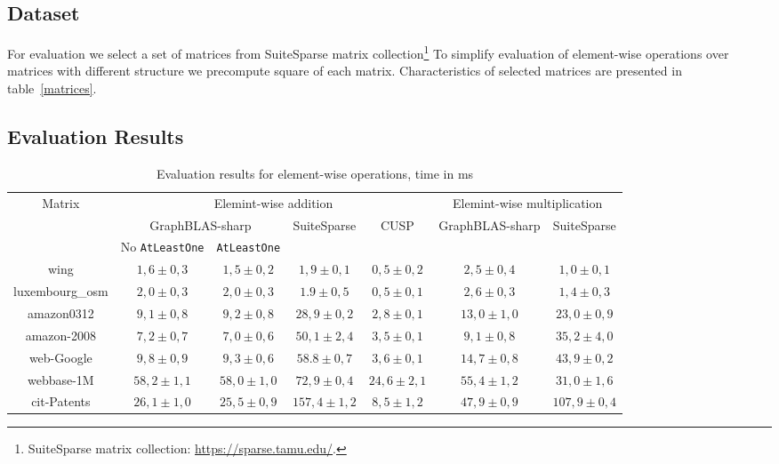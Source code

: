 \subsection {Dataset}

For evaluation we select a set of matrices from SuiteSparse matrix collection\footnote{SuiteSparse matrix collection: \url{https://sparse.tamu.edu/}.}
To simplify evaluation of element-wise operations over matrices with different structure we precompute square of each matrix. 
Characteristics of selected matrices are presented in table~\ref{matrices}.

\subsection{Evaluation Results}

\begin{table*}[h]
    \centering    
    \caption{Evaluation results for element-wise operations, time in ms}    
    \label{perf-comparison}
    \begin{tabular}{|c||c|c|c|c||c|c|}
    \hline
    \multirow{3}{*}{Matrix} & \multicolumn{4}{c||}{Elemint-wise addition} & \multicolumn{2}{c|}{Elemint-wise multiplication}\\    
    \cline{2-7}        
    & \multicolumn{2}{c|}{GraphBLAS-sharp} & \multirow{2}{*}{SuiteSparse} & \multirow{2}{*}{CUSP} & \multirow{2}{*}{GraphBLAS-sharp} & \multirow{2}{*}{SuiteSparse}        \\
    &No \texttt{AtLeastOne}&\texttt{AtLeastOne}& & & &\\ 
    \hline
    \hline
    wing            & $1,6 \pm 0,3$       & $1,5 \pm 0,2$      & $1,9\pm 0,1$   & $0,5\pm 0,2$   & $2,5 \pm 0,4$       & $1,0 \pm 0,1$\\
    \hline
    luxembourg\_osm & $2,0 \pm 0,3$       & $2,0 \pm 0,3$      & $1.9\pm 0,5$   & $0,5\pm 0,1$  & $2,6 \pm 0,3$       & $1,4 \pm 0,3$ \\
    \hline
    amazon0312      & $9,1 \pm 0,8$       & $9,2 \pm 0,8$     & $28,9\pm 0,2$  & $2,8\pm 0,1$  & $13,0 \pm 1,0$      & $23,0 \pm 0,9$ \\
    \hline
    amazon-2008     & $7,2 \pm 0,7$       & $7,0 \pm 0,6$     & $50,1\pm 2,4$  & $3,5\pm 0,1$ & $9,1 \pm 0,8$       & $35,2 \pm 4,0$  \\
    \hline
    web-Google      & $9,8 \pm 0,9$       & $9,3 \pm 0,6$     & $58.8\pm 0,7$  & $3,6\pm 0,1$  & $14,7 \pm 0,8$      & $43,9 \pm 0,2$ \\
    \hline
    webbase-1M      & $58,2 \pm 1,1$      & $58,0 \pm 1,0$      & $72,9\pm 0,4$  & $24,6\pm 2,1$  & $55,4 \pm 1,2$      & $31,0 \pm 1,6$ \\
    \hline
    cit-Patents     & $26,1 \pm 1,0$      & $25,5 \pm 0,9$      & $157,4\pm 1,2$ & $8,5\pm 1,2$   & $47,9 \pm 0,9$      & $107,9 \pm 0,4$ \\     
    \hline
    \end{tabular}    
\end{table*}

